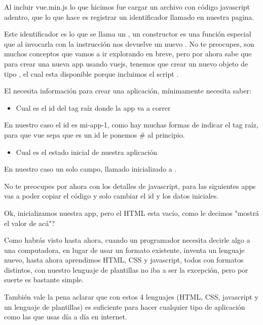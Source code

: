 \documentclass[letterpaper,10pt,spanish]{sphinxmanual}
\begin{document}
Al incluir vue.min.js lo que hicimos fue cargar un archivo con código
javascript adentro, que lo que hace es registrar un identificador llamado 
en nuestra pagina.

Este identificador es lo que se llama un , un constructor es una
función especial que al invocarla con la instrucción  nos devuelve un nuevo
. No te preocupes, son muchos conceptos que vamos a ir explorando en
breve, pero por ahora sabe que para crear una nueva app usando vuejs, tenemos
que crear un nuevo objeto de tipo , el cual esta disponible porque incluimos
el script .

El   necesita información para crear una aplicación,
mínimamente necesita saber:
\begin{itemize}
\item {} 
Cual es el id del tag raíz donde la app va a correr

\end{itemize}

En nuestro caso el id es mi-app-1, como hay muchas formas de indicar el tag
raíz, para que vue sepa que es un id le ponemos \# al principio.
\begin{itemize}
\item {} 
Cual es el estado inicial de nuestra aplicación

\end{itemize}

En nuestro caso un solo campo, llamado  inicializado a .

No te preocupes por ahora con los detalles de javascript, para las siguientes
apps vas a poder copiar el código y solo cambiar el id y los datos iniciales.

Ok, inicializamos nuestra app, pero el HTML esta vacío, como le decimos "mostrá el valor de  acá"?

Como habrás visto hasta ahora, cuando un programador necesita decirle algo a
una computadora, en lugar de usar un formato existente, inventa un lenguaje
nuevo, hasta ahora aprendimos HTML, CSS y javascript, todos con formatos
distintos, con nuestro lenguaje de plantillas no iba a ser la excepción, pero
por suerte es bastante simple.

También vale la pena aclarar que con estos 4 lenguajes (HTML, CSS, javascript y
un lenguaje de plantillas) es suficiente para hacer cualquier tipo de
aplicación como las que usas día a día en internet.
\end{document}
